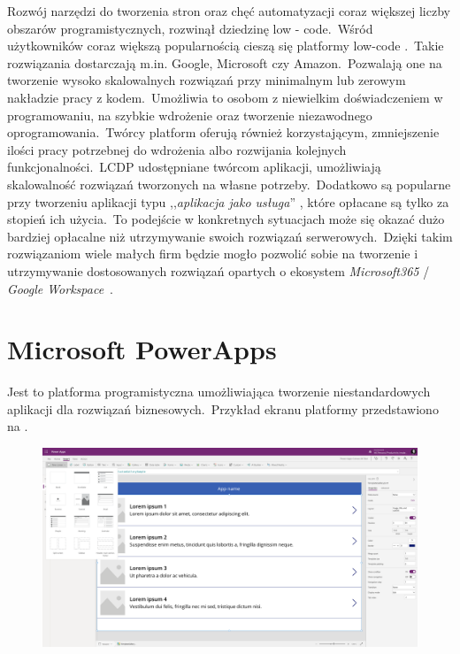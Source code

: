 Rozwój narzędzi do tworzenia stron oraz chęć automatyzacji coraz większej liczby obszarów programistycznych, rozwinął dziedzinę low - code.\ Wśród użytkowników coraz większą popularnością cieszą się platformy low-code .\ Takie rozwiązania dostarczają m.in. Google, Microsoft czy Amazon.\ Pozwalają one na tworzenie wysoko skalowalnych rozwiązań przy minimalnym lub zerowym nakładzie pracy z kodem.\ Umożliwia to osobom z niewielkim doświadczeniem w programowaniu, na szybkie wdrożenie oraz tworzenie niezawodnego oprogramowania.\ Twórcy platform oferują również korzystającym, zmniejszenie ilości pracy potrzebnej do wdrożenia albo rozwijania kolejnych funkcjonalności.\ LCDP udostępniane twórcom aplikacji, umożliwiają skalowalność rozwiązań tworzonych na własne potrzeby.\ Dodatkowo są popularne przy tworzeniu aplikacji typu ,,\textit{aplikacja jako usługa}'' , które opłacane są tylko za stopień ich użycia.\ To podejście w konkretnych sytuacjach może się okazać dużo bardziej opłacalne niż utrzymywanie swoich rozwiązań serwerowych.\ Dzięki takim rozwiązaniom wiele małych firm będzie mogło pozwolić sobie na tworzenie i utrzymywanie dostosowanych rozwiązań opartych o ekosystem \textit{Microsoft365} / \textit{Google Workspace}~\cite{Bock2021, Hirzel2022}.


\section{Microsoft PowerApps}
Jest to platforma programistyczna umożliwiająca tworzenie niestandardowych aplikacji dla rozwiązań biznesowych.\ Przykład ekranu platformy przedstawiono na .

\begin{figure}[H]
    \centering
    \includegraphics[width=\textwidth]{images/ms_powerapps}
    \label{fig:pa-plat}
\end{figure}


